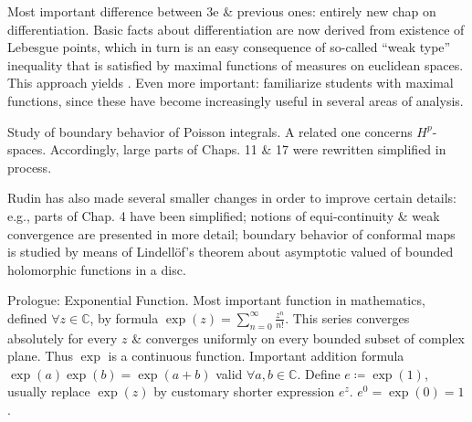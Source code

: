 \documentclass{article}
\begin{document}
\begin{itemize}
	Most important difference between 3e \& previous ones: entirely new chap on differentiation. Basic facts about differentiation are now derived from existence of Lebesgue points, which in turn is an easy consequence of so-called ``weak type'' inequality that is satisfied by maximal functions of measures on euclidean spaces. This approach yields . Even more important: familiarize students with maximal functions, since these have become increasingly useful in several areas of analysis.
	
	Study of boundary behavior of Poisson integrals. A related one concerns $H^p$-spaces. Accordingly, large parts of Chaps. 11 \& 17 were rewritten simplified in process.
	
	{\sc Rudin} has also made several smaller changes in order to improve certain details: e.g., parts of Chap. 4 have been simplified; notions of equi-continuity \& weak convergence are presented in more detail; boundary behavior of conformal maps is studied by means of Lindell\"of's theorem about asymptotic valued of bounded holomorphic functions in a disc.
	
	{\sf Prologue: Exponential Function.} Most important function in mathematics, defined $\forall z\in\mathbb{C}$, by formula $\exp(z) = \sum_{n=0}^\infty \frac{z^n}{n!}$. This series converges absolutely for every $z$ \& converges uniformly on every bounded subset of complex plane. Thus $\exp$ is a continuous function. Important addition formula $\exp(a)\exp(b) = \exp(a + b)$ valid $\forall a,b\in\mathbb{C}$. Define $e\coloneqq\exp(1)$, usually replace $\exp(z)$ by customary shorter expression $e^z$. $e^0 = \exp(0) = 1$.
	

\end{itemize}
\end{document}
